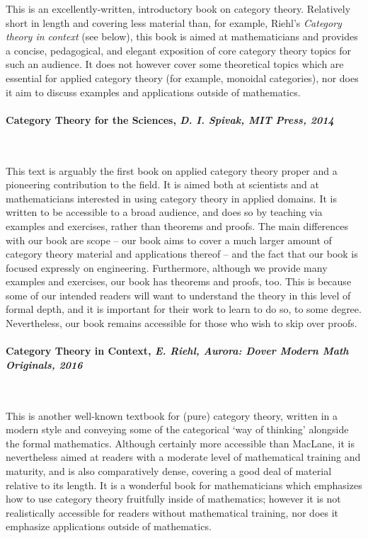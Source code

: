 \documentclass[10pt, article, one side]{memoir}
\begin{document}
    This is an excellently-written, introductory book on category theory.
    Relatively short in length and covering less material than, for example, Riehl's \emph{Category theory in context} (see below), this book is aimed at mathematicians and provides a concise, pedagogical, and elegant exposition of core category theory topics for such an audience.
    It does not however cover some theoretical topics which are essential for applied category theory (for example, monoidal categories), nor does it aim to discuss examples and applications outside of mathematics.

    \paragraph{Category Theory for the Sciences, \emph{D.
            I.
            Spivak, MIT Press, 2014}~\cite{spivak2014category}}
    \

    This text is arguably the first book on applied category theory proper and a pioneering contribution to the field.
    It is aimed both at scientists and at mathematicians interested in using category theory in applied domains.
    It is written to be accessible to a broad audience, and does so by teaching via examples and exercises, rather than theorems and proofs.
    The main differences with our book are scope -- our book aims to cover a much larger amount of category theory material and applications thereof -- and the fact that our book is focused expressly on engineering.
    Furthermore, although we provide many examples and exercises, our book has theorems and proofs, too.
    This is because some of our intended readers will want to understand the theory in this level of formal depth, and it is important for their work to learn to do so, to some degree.
    Nevertheless, our book remains accessible for those who wish to skip over proofs.

    \paragraph{Category Theory in Context, \emph{E.
            Riehl, Aurora: Dover Modern Math Originals, 2016}~\cite{riehl2017category}}
    \

    This is another well-known textbook for (pure) category theory, written in a modern style and conveying some of the categorical `way of thinking' alongside the formal mathematics.
    Although certainly more accessible than MacLane, it is nevertheless aimed at readers with a moderate level of mathematical training and maturity, and is also comparatively dense, covering a good deal of material relative to its length.
    It is a wonderful book for mathematicians which emphasizes how to use category theory fruitfully inside of mathematics; however it is not realistically accessible for readers without mathematical training, nor does it emphasize applications outside of mathematics.
\end{document}

